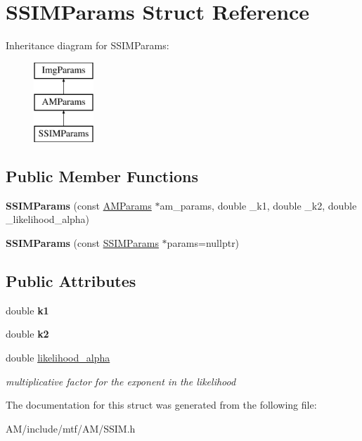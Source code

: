 \hypertarget{structSSIMParams}{\section{S\-S\-I\-M\-Params Struct Reference}
\label{structSSIMParams}
}
Inheritance diagram for S\-S\-I\-M\-Params\-:\begin{figure}[H]
\begin{center}
\leavevmode
\includegraphics[height=3.000000cm]{structSSIMParams}
\end{center}
\end{figure}
\subsection*{Public Member Functions}
\begin{DoxyCompactItemize}
\item 
\hypertarget{structSSIMParams_a46a5aa8d6ab3f46467482252a6297be9}{{\bfseries S\-S\-I\-M\-Params} (const \hyperlink{structAMParams}{A\-M\-Params} $\ast$am\-\_\-params, double \-\_\-k1, double \-\_\-k2, double \-\_\-likelihood\-\_\-alpha)}\label{structSSIMParams_a46a5aa8d6ab3f46467482252a6297be9}

\item 
\hypertarget{structSSIMParams_a4624e727dc99fecc4e6fcbe00e63c83d}{{\bfseries S\-S\-I\-M\-Params} (const \hyperlink{structSSIMParams}{S\-S\-I\-M\-Params} $\ast$params=nullptr)}\label{structSSIMParams_a4624e727dc99fecc4e6fcbe00e63c83d}

\end{DoxyCompactItemize}
\subsection*{Public Attributes}
\begin{DoxyCompactItemize}
\item 
\hypertarget{structSSIMParams_ae9ead5b969baaa316abd0d3996f52712}{double {\bfseries k1}}\label{structSSIMParams_ae9ead5b969baaa316abd0d3996f52712}

\item 
\hypertarget{structSSIMParams_a4a8b7632605e9532a54ef5aac26195c9}{double {\bfseries k2}}\label{structSSIMParams_a4a8b7632605e9532a54ef5aac26195c9}

\item 
\hypertarget{structSSIMParams_ac66697e2f8738395fa415c6d3f726774}{double \hyperlink{structSSIMParams_ac66697e2f8738395fa415c6d3f726774}{likelihood\-\_\-alpha}}\label{structSSIMParams_ac66697e2f8738395fa415c6d3f726774}

\begin{DoxyCompactList}\small\item\em multiplicative factor for the exponent in the likelihood \end{DoxyCompactList}\end{DoxyCompactItemize}


The documentation for this struct was generated from the following file\-:\begin{DoxyCompactItemize}
\item 
A\-M/include/mtf/\-A\-M/S\-S\-I\-M.\-h\end{DoxyCompactItemize}
